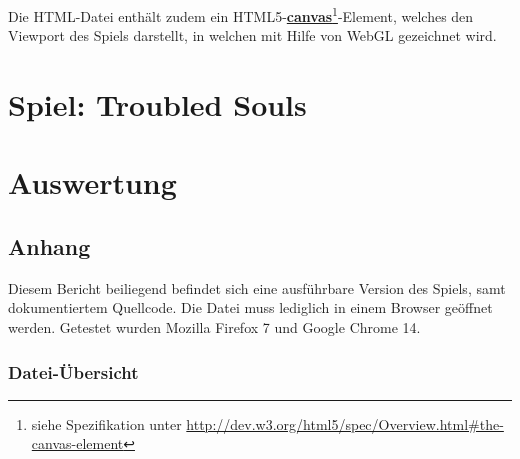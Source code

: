 Die HTML-Datei enthält zudem ein HTML5-\textbf{\href{http://dev.w3.org/html5/spec/Overview.html\#the-canvas-element}{canvas}}\footnote{siehe Spezifikation unter \url{http://dev.w3.org/html5/spec/Overview.html\#the-canvas-element}}-Element, welches den Viewport des Spiels darstellt, in welchen mit Hilfe von WebGL gezeichnet wird.













\part{Spiel: Troubled Souls}



\part{Auswertung}



\chapter*{Anhang}

Diesem Bericht beiliegend befindet sich eine ausführbare Version des Spiels, samt dokumentiertem Quellcode. Die Datei  muss lediglich in einem Browser geöffnet werden. Getestet wurden Mozilla Firefox 7 und Google Chrome 14.


\section*{Datei-Übersicht}

